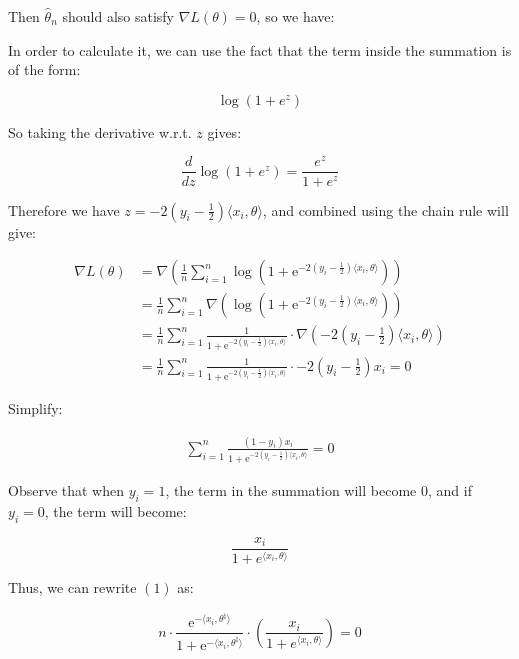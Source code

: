 \documentclass{article}
\begin{document}
Then $\hat{\theta}_n$ should also satisfy $\nabla L(\theta) = 0$, so we have:

In order to calculate it, we can use the fact that the term inside the summation is of the form:

\begin{equation*}
    \log(1 + e^z)
\end{equation*}

So taking the derivative w.r.t. $z$ gives:

\begin{equation*}
    \frac{d}{dz} \log(1 + e^z) = \frac{e^z}{1 + e^z}
\end{equation*}

Therefore we have $z = -2(y_i - \frac{1}{2})\langle x_i, \theta \rangle$, and combined using the chain rule will give:

\begin{align*}
    \nabla L(\theta)
    &= \nabla \left( \frac{1}{n} \sum_{i = 1}^n \log \left( 1 + \mathrm{e}^{-2(y_i - \frac{1}{2})\langle x_i, \theta \rangle} \right) \right) \\
    &= \frac{1}{n} \sum_{i = 1}^n \nabla \left( \log \left( 1 + \mathrm{e}^{-2(y_i - \frac{1}{2})\langle x_i, \theta \rangle} \right) \right) \\
    &= \frac{1}{n} \sum_{i = 1}^n \frac{1}{1 + \mathrm{e}^{-2(y_i - \frac{1}{2})\langle x_i, \theta \rangle}} \cdot \nabla \left( -2(y_i - \frac{1}{2})\langle x_i, \theta \rangle \right) \\
    &= \frac{1}{n} \sum_{i = 1}^n \frac{1}{1 + \mathrm{e}^{-2(y_i - \frac{1}{2})\langle x_i, \theta \rangle}} \cdot -2(y_i - \frac{1}{2}) x_i = 0
\end{align*}

Simplify:

\begin{align*}
    \sum_{i = 1}^n \frac{(1 - y_i)x_i}{1 + \mathrm{e}^{-2(y_i - \frac{1}{2})\langle x_i, \theta \rangle}} = 0 \tag{1}
\end{align*}

Observe that when $y_i = 1$, the term in the summation will become $0$, 
and if $y_i = 0$, the term will become:

\begin{equation*}
    \frac{x_i}{1 + e^{\langle x_i, \theta \rangle}}
\end{equation*}

Thus, we can rewrite $(1)$ as:

\begin{equation*}
    n \cdot \frac{\mathrm{e}^{-\langle x_i, \theta^\natural \rangle}}{1 + \mathrm{e}^{-\langle x_i, \theta^\natural \rangle}} \cdot \left( \frac{x_i}{1 + e^{\langle x_i, \theta \rangle}} \right) = 0
\end{equation*}
\end{document}
